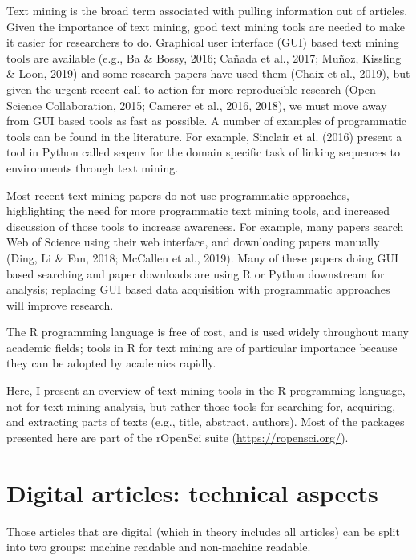 \documentclass[author-year, review, 11pt]{components/elsarticle} %
\begin{document}
Text mining is the broad term associated with pulling information out of
articles. Given the importance of text mining, good text mining tools
are needed to make it easier for researchers to do. Graphical user
interface (GUI) based text mining tools are available (e.g., Ba \&
Bossy, 2016; Cañada et al., 2017; Muñoz, Kissling \& Loon, 2019) and
some research papers have used them (Chaix et al., 2019), but given the
urgent recent call to action for more reproducible research (Open
Science Collaboration, 2015; Camerer et al., 2016, 2018), we must move
away from GUI based tools as fast as possible. A number of examples of
programmatic tools can be found in the literature. For example, Sinclair
et al. (2016) present a tool in Python called seqenv for the domain
specific task of linking sequences to environments through text mining.

Most recent text mining papers do not use programmatic approaches,
highlighting the need for more programmatic text mining tools, and
increased discussion of those tools to increase awareness. For example,
many papers search Web of Science using their web interface, and
downloading papers manually (Ding, Li \& Fan, 2018; McCallen et al.,
2019). Many of these papers doing GUI based searching and paper
downloads are using R or Python downstream for analysis; replacing GUI
based data acquisition with programmatic approaches will improve
research.

The R programming language is free of cost, and is used widely
throughout many academic fields; tools in R for text mining are of
particular importance because they can be adopted by academics rapidly.

Here, I present an overview of text mining tools in the R programming
language, not for text mining analysis, but rather those tools for
searching for, acquiring, and extracting parts of texts (e.g., title,
abstract, authors). Most of the packages presented here are part of the
rOpenSci suite (\url{https://ropensci.org/}).

\hypertarget{digital-articles-technical-aspects}{%
\section{Digital articles: technical
aspects}\label{digital-articles-technical-aspects}}

Those articles that are digital (which in theory includes all articles)
can be split into two groups: machine readable and non-machine readable.
\end{document}
